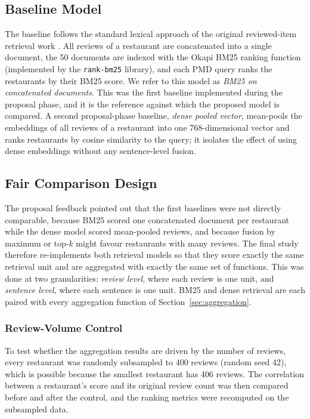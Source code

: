 \subsection{Baseline Model}
\label{sec:baseline}

The baseline follows the standard lexical approach of the original reviewed-item retrieval work \citep{abdollahpour2023}. All reviews of a restaurant are concatenated into a single document, the 50 documents are indexed with the Okapi BM25 ranking function \citep{robertson2009} (implemented by the \texttt{rank-bm25} library), and each PMD query ranks the restaurants by their BM25 score. We refer to this model as \emph{BM25 on concatenated documents}. This was the first baseline implemented during the proposal phase, and it is the reference against which the proposed model is compared. A second proposal-phase baseline, \emph{dense pooled vector}, mean-pools the embeddings of all reviews of a restaurant into one 768-dimensional vector and ranks restaurants by cosine similarity to the query; it isolates the effect of using dense embeddings without any sentence-level fusion.

\subsection{Fair Comparison Design}
\label{sec:faircomparison}

The proposal feedback pointed out that the first baselines were not directly comparable, because BM25 scored one concatenated document per restaurant while the dense model scored mean-pooled reviews, and because fusion by maximum or top-$k$ might favour restaurants with many reviews. The final study therefore re-implements both retrieval models so that they score exactly the same retrieval unit and are aggregated with exactly the same set of functions. This was done at two granularities: \emph{review level}, where each review is one unit, and \emph{sentence level}, where each sentence is one unit. BM25 and dense retrieval are each paired with every aggregation function of Section~\ref{sec:aggregation}.

\subsubsection{Review-Volume Control}
\label{sec:volumecontrol}

To test whether the aggregation results are driven by the number of reviews, every restaurant was randomly subsampled to 400 reviews (random seed 42), which is possible because the smallest restaurant has 406 reviews. The correlation between a restaurant's score and its original review count was then compared before and after the control, and the ranking metrics were recomputed on the subsampled data.

